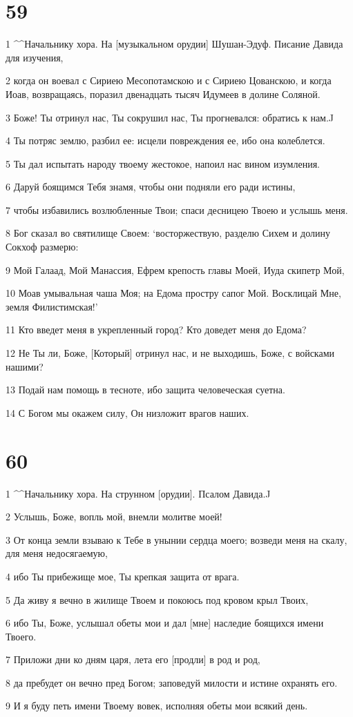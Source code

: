 \chapter{59}

\par 1 ^^Начальнику хора. На [музыкальном орудии] Шушан-Эдуф. Писание Давида для изучения,
\par 2 когда он воевал с Сириею Месопотамскою и с Сириею Цованскою, и когда Иоав, возвращаясь, поразил двенадцать тысяч Идумеев в долине Соляной.
\par 3 Боже! Ты отринул нас, Ты сокрушил нас, Ты прогневался: обратись к нам.^^
\par 4 Ты потряс землю, разбил ее: исцели повреждения ее, ибо она колеблется.
\par 5 Ты дал испытать народу твоему жестокое, напоил нас вином изумления.
\par 6 Даруй боящимся Тебя знамя, чтобы они подняли его ради истины,
\par 7 чтобы избавились возлюбленные Твои; спаси десницею Твоею и услышь меня.
\par 8 Бог сказал во святилище Своем: `восторжествую, разделю Сихем и долину Сокхоф размерю:
\par 9 Мой Галаад, Мой Манассия, Ефрем крепость главы Моей, Иуда скипетр Мой,
\par 10 Моав умывальная чаша Моя; на Едома простру сапог Мой. Восклицай Мне, земля Филистимская!'
\par 11 Кто введет меня в укрепленный город? Кто доведет меня до Едома?
\par 12 Не Ты ли, Боже, [Который] отринул нас, и не выходишь, Боже, с войсками нашими?
\par 13 Подай нам помощь в тесноте, ибо защита человеческая суетна.
\par 14 С Богом мы окажем силу, Он низложит врагов наших.

\chapter{60}

\par 1 ^^Начальнику хора. На струнном [орудии]. Псалом Давида.^^
\par 2 Услышь, Боже, вопль мой, внемли молитве моей!
\par 3 От конца земли взываю к Тебе в унынии сердца моего; возведи меня на скалу, для меня недосягаемую,
\par 4 ибо Ты прибежище мое, Ты крепкая защита от врага.
\par 5 Да живу я вечно в жилище Твоем и покоюсь под кровом крыл Твоих,
\par 6 ибо Ты, Боже, услышал обеты мои и дал [мне] наследие боящихся имени Твоего.
\par 7 Приложи дни ко дням царя, лета его [продли] в род и род,
\par 8 да пребудет он вечно пред Богом; заповедуй милости и истине охранять его.
\par 9 И я буду петь имени Твоему вовек, исполняя обеты мои всякий день.

